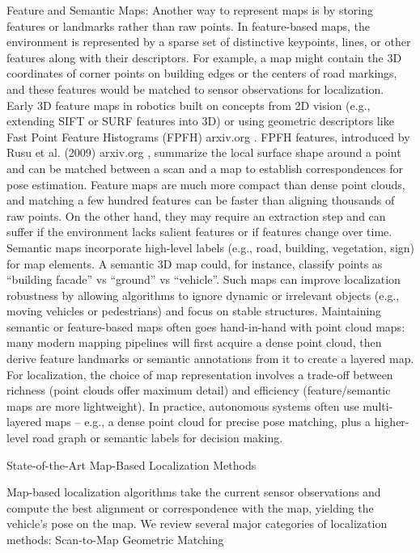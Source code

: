     Feature and Semantic Maps: Another way to represent maps is by storing features or landmarks rather than raw points. In feature-based maps, the environment is represented by a sparse set of distinctive keypoints, lines, or other features along with their descriptors. For example, a map might contain the 3D coordinates of corner points on building edges or the centers of road markings, and these features would be matched to sensor observations for localization. Early 3D feature maps in robotics built on concepts from 2D vision (e.g., extending SIFT or SURF features into 3D) or using geometric descriptors like Fast Point Feature Histograms (FPFH)​
    arxiv.org
    . FPFH features, introduced by Rusu et al. (2009)​
    arxiv.org
    , summarize the local surface shape around a point and can be matched between a scan and a map to establish correspondences for pose estimation. Feature maps are much more compact than dense point clouds, and matching a few hundred features can be faster than aligning thousands of raw points. On the other hand, they may require an extraction step and can suffer if the environment lacks salient features or if features change over time. Semantic maps incorporate high-level labels (e.g., road, building, vegetation, sign) for map elements. A semantic 3D map could, for instance, classify points as “building facade” vs “ground” vs “vehicle”. Such maps can improve localization robustness by allowing algorithms to ignore dynamic or irrelevant objects (e.g., moving vehicles or pedestrians) and focus on stable structures. Maintaining semantic or feature-based maps often goes hand-in-hand with point cloud maps: many modern mapping pipelines will first acquire a dense point cloud, then derive feature landmarks or semantic annotations from it to create a layered map. For localization, the choice of map representation involves a trade-off between richness (point clouds offer maximum detail) and efficiency (feature/semantic maps are more lightweight). In practice, autonomous systems often use multi-layered maps – e.g., a dense point cloud for precise pose matching, plus a higher-level road graph or semantic labels for decision making.

State-of-the-Art Map-Based Localization Methods

Map-based localization algorithms take the current sensor observations and compute the best alignment or correspondence with the map, yielding the vehicle’s pose on the map. We review several major categories of localization methods:
Scan-to-Map Geometric Matching

